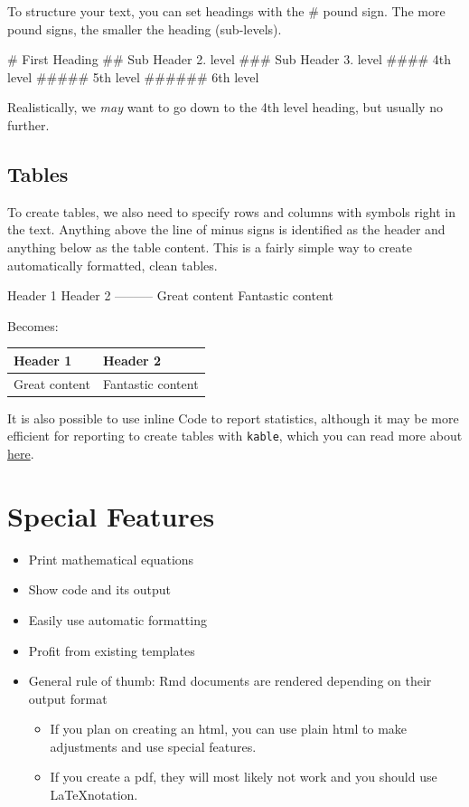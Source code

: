 \documentclass[
]{book}
\providecommand{\tightlist}{%
  \setlength{\itemsep}{0pt}\setlength{\parskip}{0pt}}
\begin{document}
To structure your text, you can set headings with the \# pound sign.
The more pound signs, the smaller the heading (sub-levels).

\# First Heading
\#\# Sub Header 2. level
\#\#\# Sub Header 3. level
\#\#\#\# 4th level
\#\#\#\#\# 5th level
\#\#\#\#\#\# 6th level

Realistically, we \emph{may} want to go down to the 4th level heading, but usually no further.

\subsection*{Tables}\label{tables}

To create tables, we also need to specify rows and columns with symbols right in the text.
Anything above the line of minus signs is identified as the header and anything below as the table content.
This is a fairly simple way to create automatically formatted, clean tables.

Header 1 \textbar{} Header 2
-----\textbar-----
Great content \textbar{} Fantastic content

Becomes:

\begin{longtable}[]{@{}ll@{}}
\toprule\noalign{}
Header 1 & Header 2 \\
\midrule\noalign{}
\endhead
\bottomrule\noalign{}
\endlastfoot
Great content & Fantastic content \\
\end{longtable}

It is also possible to use inline Code to report statistics, although it may be more efficient for reporting to create tables with \texttt{kable}, which you can read more about \href{https://cran.r-project.org/web/packages/kableExtra/vignettes/awesome_table_in_html.html}{here}.

\section{Special Features}\label{special-features}

\begin{itemize}
\tightlist
\item
  Print mathematical equations
\item
  Show code and its output
\item
  Easily use automatic formatting
\item
  Profit from existing templates
\item
  General rule of thumb: Rmd documents are rendered depending on their output format

  \begin{itemize}
  \tightlist
  \item
    If you plan on creating an html, you can use plain html to make adjustments and use special features.
  \item
    If you create a pdf, they will most likely not work and you should use \LaTeX notation.
  \end{itemize}
\end{itemize}
\end{document}
